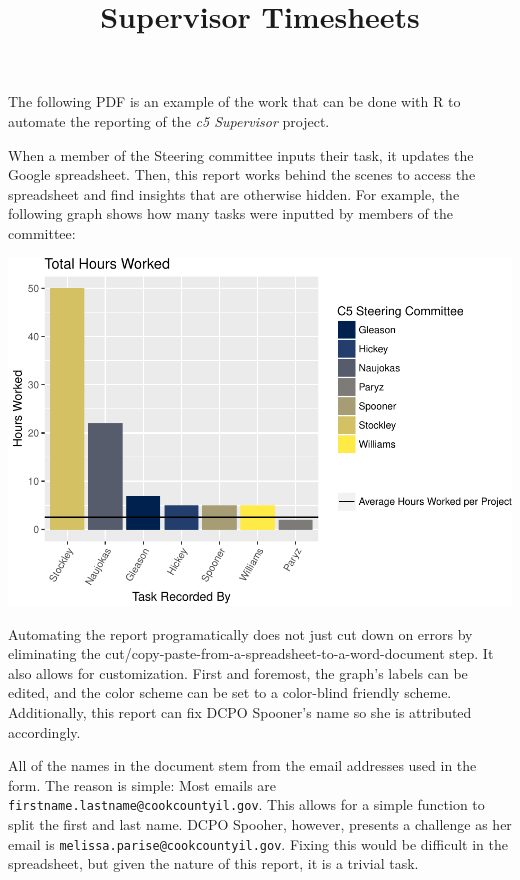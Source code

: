 \documentclass[]{article}
\title{Supervisor Timesheets}
\author{}
\date{}
\begin{document}
\maketitle

The following PDF is an example of the work that can be done with R to
automate the reporting of the \emph{c5 Supervisor} project.

When a member of the Steering committee inputs their task, it updates
the Google spreadsheet. Then, this report works behind the scenes to
access the spreadsheet and find insights that are otherwise hidden. For
example, the following graph shows how many tasks were inputted by
members of the committee:

\includegraphics{reports_files/figure-latex/hours_worked-1.pdf}

Automating the report programatically does not just cut down on errors
by eliminating the cut/copy-paste-from-a-spreadsheet-to-a-word-document
step. It also allows for customization. First and foremost, the graph's
labels can be edited, and the color scheme can be set to a color-blind
friendly scheme. Additionally, this report can fix DCPO Spooner's name
so she is attributed accordingly.

All of the names in the document stem from the email addresses used in
the form. The reason is simple: Most emails are
\texttt{firstname.lastname@cookcountyil.gov}. This allows for a simple
function to split the first and last name. DCPO Spooher, however,
presents a challenge as her email is
\texttt{melissa.parise@cookcountyil.gov}. Fixing this would be difficult
in the spreadsheet, but given the nature of this report, it is a trivial
task.
\end{document}

